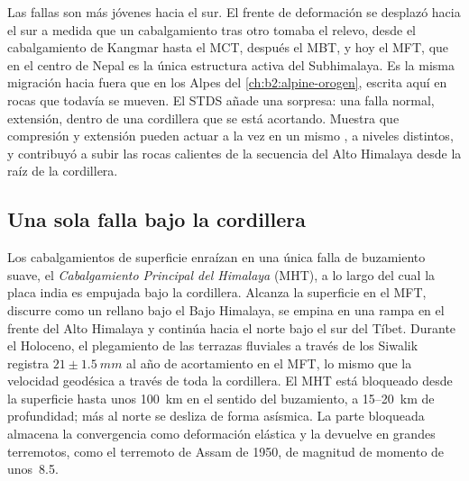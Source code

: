 Las fallas son más jóvenes hacia el sur. El frente de deformación se desplazó hacia el sur a medida que un cabalgamiento tras otro
tomaba el relevo, desde el cabalgamiento de Kangmar hasta el MCT, después el MBT, y hoy el MFT, que en
el centro de Nepal es la única estructura activa del Subhimalaya. Es la misma migración hacia fuera
que en los Alpes del \cref{ch:b2:alpine-orogen}, escrita aquí en rocas que todavía
se mueven. El STDS añade una sorpresa: una falla normal, extensión, dentro de una cordillera que se está
acortando. Muestra que compresión y extensión pueden actuar a la vez en un mismo ,
a niveles distintos, y contribuyó a subir las rocas calientes de la secuencia del Alto Himalaya
desde la raíz de la cordillera.

\subsection{Una sola falla bajo la cordillera}

Los cabalgamientos de superficie enraízan en una única falla de buzamiento suave, el \emph{Cabalgamiento Principal
del Himalaya} (MHT), a lo largo del cual la placa india es empujada bajo la cordillera. Alcanza
la superficie en el MFT, discurre como un rellano bajo el Bajo Himalaya, se empina en una rampa en
el frente del Alto Himalaya y continúa hacia el norte bajo el sur del Tíbet. Durante el Holoceno,
el plegamiento de las terrazas fluviales a través de los Siwalik registra $21 \pm \qty{1.5}{mm}$ al año de
acortamiento en el MFT, lo mismo que la velocidad geodésica a través de toda la cordillera. El MHT está
bloqueado desde la superficie hasta unos \qty{100}{km} en el sentido del buzamiento, a 15--\qty{20}{km} de profundidad; más
al norte se desliza de forma asísmica. La parte bloqueada almacena la convergencia como deformación elástica y la devuelve
en grandes terremotos, como el terremoto de Assam de 1950, de magnitud de momento de unos~8.5.


